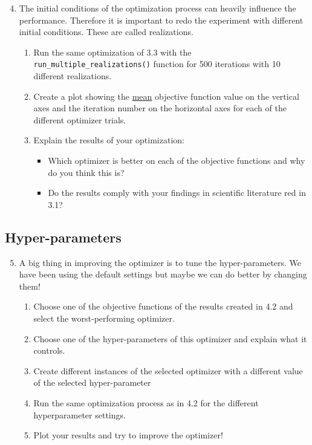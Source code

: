 \documentclass[10pt,a4paper,twoside]{article} %
\def\code#1{\texttt{#1}}
\begin{document}
\begin{enumerate}
	\setcounter{enumi}{3}
	\item The initial conditions of the optimization process can heavily influence the performance. Therefore it is important to redo the experiment with different initial conditions. These are called realizations.
	
	\begin{enumerate} [label*=\arabic*.]
		\item Run the same optimization of 3.3 with the \code{run\_multiple\_realizations()} function for 500 iterations with 10 different realizations.
		
		\item Create a plot showing the \underline{mean} objective function value on the vertical axes and the iteration number on the horizontal axes for each of the different optimizer trials.
		
		\item Explain the results of your optimization:
		\begin{itemize}
			\item Which optimizer is better on each of the objective functions and why do you think this is?
			\item Do the results comply with your findings in scientific literature red in 3.1?
		
		\end{itemize}
	\end{enumerate}
\end{enumerate}

\subsection*{Hyper-parameters}

\begin{enumerate}
	\setcounter{enumi}{4}
	\item A big thing in improving the optimizer is to tune the hyper-parameters. We have been using the default settings but maybe we can do better by changing them!
	
	\begin{enumerate} [label*=\arabic*.]
		\item Choose one of the objective functions of the results created in 4.2 and select the worst-performing optimizer.
		\item Choose one of the hyper-parameters of this optimizer and explain what it controls.
		\item Create different instances of the selected optimizer with a different value of the selected hyper-parameter
		\item Run the same optimization process as in 4.2 for the different hyperparameter settings.
		\item Plot your results and try to improve the optimizer! 
	\end{enumerate}
\end{enumerate}
\end{document}
